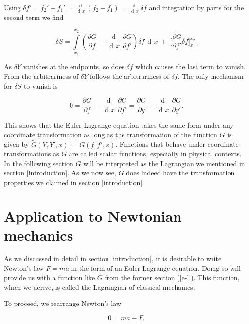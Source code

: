 \documentclass[prb,preprint]{revtex4-1}
\DeclareMathOperator{\dd}{d\!}
\DeclareMathOperator{\ddd}{\mathrm{d}}
\begin{document}
Using $\delta f' = f_2' - f_1' = \frac{\ddd}{\dd x}(f_2 - f_1) = \frac{\dd}{\dd x} \delta f$ and integration by parts for the second term we find


\begin{equation}
\delta S = \int\limits_{x_1}^{x_2} \left( \frac{\partial G}{\partial f}
- \frac{\ddd}{\dd x} \frac{\partial G}{\partial f'} \right) \delta f \, \dd x \;
+ \; \bigg[\frac{\partial G}{\partial f'} \delta f \bigg]_{x_1}^{x_2}.
\end{equation}


As $\delta Y$ vanishes at the endpoints, so does $\delta f$ which causes the last term to vanish. From the arbitrariness of $\delta Y$ follows the arbitrariness of $\delta f$. The only mechanism for $\delta S$ to vanish is

\begin{equation}
0 = \frac{\partial G}{\partial f} - \frac{\ddd}{\dd x} \frac{\partial G}{\partial f'}
= \frac{\partial G}{\partial y} - \frac{\ddd}{\dd x} \frac{\partial G}{\partial y'}.
\end{equation}

This shows that the Euler-Lagrange equation takes the same form under any coordinate transformation as long as the transformation of the function $G$ is given by $\widetilde{G}(Y,Y',x) := G(f,f',x)$. Functions that behave under coordinate transformations as $G$ are called scalar functions, especially in physical contexts. 
In the following section $G$ will be interpreted as the Lagrangian we mentioned in section \ref{introduction}. 
As we now see, $G$ does indeed have the transformation properties we claimed in section \ref{introduction}.

\section{Application to Newtonian mechanics \cite{Guthrie}} %

As we discussed in detail in section \ref{introduction}, it is desirable to write Newton's law $F=ma$ in the form of an Euler-Lagrange equation. 
Doing so will provide us with a function like $G$ from the former section (\ref{e-l}). 
This function, which we derive, is called the Lagrangian of classical mechanics.

To proceed, we rearrange Newton's law

\begin{equation}
0 = ma - F.
\end{equation}
\end{document}
